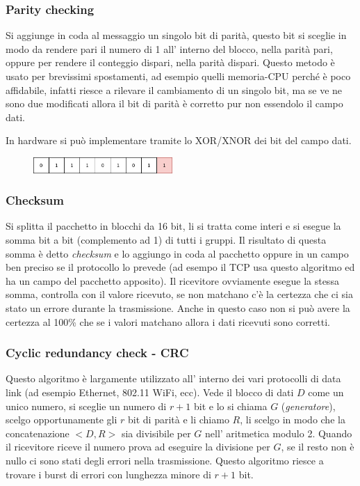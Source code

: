 \subsubsection{Parity checking}
Si aggiunge in coda al messaggio un singolo bit di parità, questo bit si sceglie in modo da rendere pari il  numero di 1 all' interno del blocco, nella parità pari, oppure per rendere il conteggio dispari, nella parità dispari.
Questo metodo è usato per brevissimi spostamenti, ad esempio quelli memoria-CPU perché è poco affidabile, infatti riesce a rilevare il cambiamento di un singolo bit, ma se ve ne sono due modificati allora il bit di parità è corretto pur non essendolo il campo dati.

In hardware si può implementare tramite lo XOR/XNOR dei bit del campo dati.
\begin{figure}[H]
    \centering
    \includegraphics[width=200px]{images/3_Reti_connessione_diretta/parity_checking.png}
\end{figure}

\subsubsection{Checksum}
Si splitta il pacchetto in blocchi da 16 bit, li si tratta come interi e si esegue la somma bit a bit (complemento ad 1) di tutti i gruppi.
Il risultato di questa somma è detto \emph{checksum} e lo aggiungo in coda al pacchetto oppure in un campo ben preciso se il protocollo lo prevede (ad esempo il TCP usa questo algoritmo ed ha un campo del pacchetto apposito).
Il ricevitore ovviamente esegue la stessa somma, controlla con il valore ricevuto, se non matchano c'è la certezza che ci sia stato un errore durante la trasmissione.
Anche in questo caso non si può avere la certezza al 100\% che se i valori matchano allora i dati ricevuti sono corretti.

\subsubsection{Cyclic redundancy check - CRC}
Questo algoritmo è largamente utilizzato all' interno dei vari protocolli di data link (ad esempio Ethernet, 802.11 WiFi, ecc).
Vede il blocco di dati $D$ come un unico numero, si sceglie un numero di $r+1$ bit e lo si chiama $G$ (\emph{generatore}), scelgo opportunamente gli $r$ bit di parità e li chiamo $R$, li scelgo in modo che la concatenazione $<D, R>$ sia divisibile per $G$ nell' aritmetica modulo 2.
Quando il ricevitore riceve il numero prova ad eseguire la divisione per $G$, se il resto non è nullo ci sono stati degli errori nella trasmissione.
Questo algoritmo riesce a trovare i burst di errori con lunghezza minore di $r+1$ bit.

